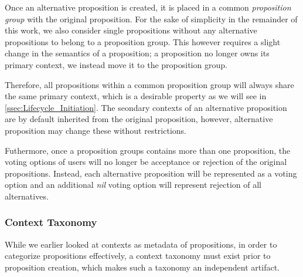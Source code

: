 Once an alternative proposition is created, it is placed in a common \emph{proposition group} with the original proposition.
For the sake of simplicity in the remainder of this work, we also consider single propositions without any alternative propositions to belong to a proposition group.
This however requires a slight change in the semantics of a proposition; a proposition no longer owns its primary context, we instead move it to the proposition group.

Therefore, all propositions within a common proposition group will always share the same primary context, which is a desirable property as we will see in \autoref{ssec:Lifecycle_Initiation}.
The seondary contexts of an alternative proposition are by default inherited from the original proposition, however, alternative proposition may change these without restrictions.

Futhermore, once a proposition groups contains more than one proposition, the voting options of users will no longer be  acceptance or rejection of the original propositions.
Instead, each alternative proposition will be represented as a voting option and an additional \textit{nil} voting option will represent rejection of all alternatives.

\subsubsection{Context Taxonomy}
\label{sec:Model_Contexts}
While we earlier looked at contexts as metadata of propositions, in order to categorize propositions effectively, a context taxonomy must exist prior to proposition creation, which makes such a taxonomy an independent artifact.

